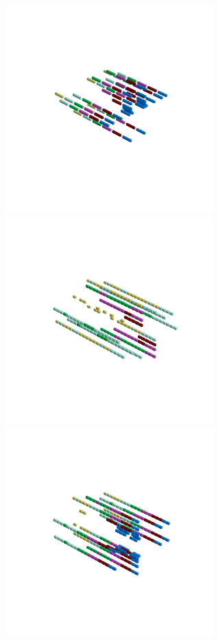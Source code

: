 \begin{minipage}[b]{0.50\linewidth}                                       
  \begin{figure}[H]
      \centering
        \vspace*{-1cm}
        \hspace*{-2cm}
        \includegraphics[width=8cm]{src/symmetries/pattern12_1-45.png}%
        \hspace*{-4cm}
        \includegraphics[width=8cm]{src/symmetries/pattern12_2-45.png}\\
        \vspace*{-5cm}
        \hspace*{-3cm}
        \includegraphics[width=8cm]{src/symmetries/pattern12_3-45.png}\\

\end{figure}
\end{minipage}
